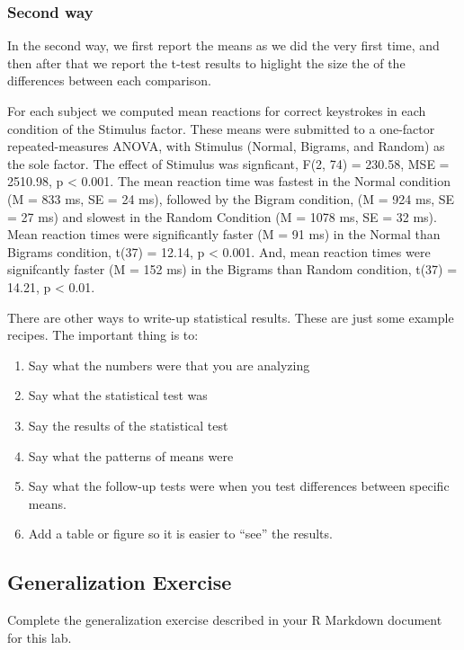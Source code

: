 \documentclass[]{book}
\providecommand{\tightlist}{%
  \setlength{\itemsep}{0pt}\setlength{\parskip}{0pt}}
\theoremstyle{definition}
\theoremstyle{definition}
\theoremstyle{definition}
\theoremstyle{remark}
\begin{document}
\subsubsection{Second way}\label{second-way}

In the second way, we first report the means as we did the very first
time, and then after that we report the t-test results to higlight the
size the of the differences between each comparison.

For each subject we computed mean reactions for correct keystrokes in
each condition of the Stimulus factor. These means were submitted to a
one-factor repeated-measures ANOVA, with Stimulus (Normal, Bigrams, and
Random) as the sole factor. The effect of Stimulus was signficant, F(2,
74) = 230.58, MSE = 2510.98, p \textless{} 0.001. The mean reaction time
was fastest in the Normal condition (M = 833 ms, SE = 24 ms), followed
by the Bigram condition, (M = 924 ms, SE = 27 ms) and slowest in the
Random Condition (M = 1078 ms, SE = 32 ms). Mean reaction times were
significantly faster (M = 91 ms) in the Normal than Bigrams condition,
t(37) = 12.14, p \textless{} 0.001. And, mean reaction times were
signifcantly faster (M = 152 ms) in the Bigrams than Random condition,
t(37) = 14.21, p \textless{} 0.01.

There are other ways to write-up statistical results. These are just
some example recipes. The important thing is to:

\begin{enumerate}
\def\labelenumi{\arabic{enumi}.}
\tightlist
\item
  Say what the numbers were that you are analyzing
\item
  Say what the statistical test was
\item
  Say the results of the statistical test
\item
  Say what the patterns of means were
\item
  Say what the follow-up tests were when you test differences between
  specific means.
\item
  Add a table or figure so it is easier to ``see'' the results.
\end{enumerate}

\subsection{Generalization Exercise}\label{generalization-exercise-6}

Complete the generalization exercise described in your R Markdown
document for this lab.
\end{document}
